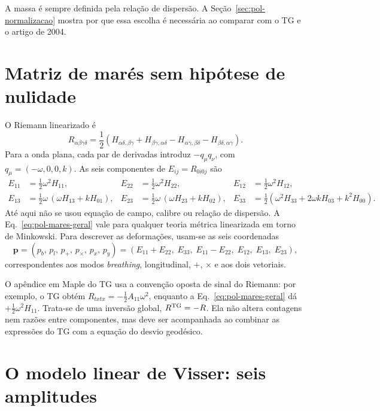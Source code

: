 A massa é sempre definida pela relação de dispersão. A
Seção~\ref{sec:pol-normalizacao} mostra por que essa escolha é necessária
ao comparar com o TG e o artigo de 2004.

\section{Matriz de marés sem hipótese de nulidade}

O Riemann linearizado é
\begin{equation}
 R_{\alpha\beta\gamma\delta}=\frac12\left(
 H_{\alpha\delta,\beta\gamma}+H_{\beta\gamma,\alpha\delta}
 -H_{\alpha\gamma,\beta\delta}-H_{\beta\delta,\alpha\gamma}\right).
 \label{eq:pol-riemann}
\end{equation}
Para a onda plana, cada par de derivadas introduz $-q_\mu q_\nu$, com
$q_\mu=(-\omega,0,0,k)$. As seis componentes de $E_{ij}=R_{0i0j}$ são
\begin{equation}
 \begin{aligned}
 E_{11}&=\tfrac12\omega^2H_{11}, &
 E_{22}&=\tfrac12\omega^2H_{22}, &
 E_{12}&=\tfrac12\omega^2H_{12},\\
 E_{13}&=\tfrac12\omega\,(\omega H_{13}+kH_{01}), &
 E_{23}&=\tfrac12\omega\,(\omega H_{23}+kH_{02}), &
 E_{33}&=\tfrac12\left(\omega^2H_{33}+2\omega kH_{03}+k^2H_{00}\right).
 \end{aligned}
 \label{eq:pol-mares-geral}
\end{equation}
Até aqui não se usou equação de campo, calibre ou relação de dispersão.
A Eq.~\eqref{eq:pol-mares-geral} vale para qualquer teoria métrica
linearizada em torno de Minkowski. Para descrever as deformações,
usam-se as seis coordenadas
\begin{equation}
 \mathbf p=(p_b,\,p_l,\,p_+,\,p_\times,\,p_x,\,p_y)
 =(E_{11}+E_{22},\;E_{33},\;E_{11}-E_{22},\;E_{12},\;E_{13},\;E_{23}),
 \label{eq:pol-coordenadas}
\end{equation}
correspondentes aos modos \emph{breathing}, longitudinal, $+$, $\times$
e aos dois vetoriais.

O apêndice em Maple do TG usa a convenção oposta de sinal do Riemann:
por exemplo, o TG obtém $R_{txtx}=-\frac12A_{11}\omega^2$, enquanto a
Eq.~\eqref{eq:pol-mares-geral} dá $+\frac12\omega^2H_{11}$. Trata-se de
uma inversão global, $R^{\rm TG}=-R$. Ela não altera contagens nem
razões entre componentes, mas deve ser acompanhada ao combinar as
expressões do TG com a equação do desvio geodésico.

\section{O modelo linear de Visser: seis amplitudes}

